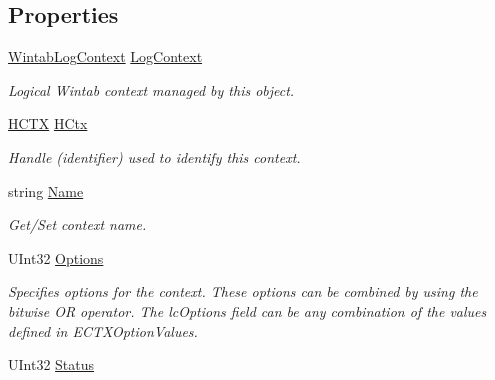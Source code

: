 \subsection*{Properties}
\begin{DoxyCompactItemize}
\item 
\mbox{\hyperlink{struct_wintab_d_n_1_1_wintab_log_context}{Wintab\+Log\+Context}} \mbox{\hyperlink{class_wintab_d_n_1_1_c_wintab_context_ad1aaf328b7c7aeb2b98e8c4e167047b6}{Log\+Context}}
\begin{DoxyCompactList}\small\item\em Logical Wintab context managed by this object. ~\newline
\end{DoxyCompactList}\item 
\mbox{\hyperlink{class_wintab_d_n_1_1_h_c_t_x}{H\+C\+TX}} \mbox{\hyperlink{class_wintab_d_n_1_1_c_wintab_context_ad4709db10fbf92aa19dcdf0c19c53415}{H\+Ctx}}
\begin{DoxyCompactList}\small\item\em Handle (identifier) used to identify this context. \end{DoxyCompactList}\item 
string \mbox{\hyperlink{class_wintab_d_n_1_1_c_wintab_context_a275c652af6e326a3b8750ae5ea047237}{Name}}
\begin{DoxyCompactList}\small\item\em Get/\+Set context name. \end{DoxyCompactList}\item 
U\+Int32 \mbox{\hyperlink{class_wintab_d_n_1_1_c_wintab_context_a3e5d1e938f9bd00d82474b670292b5a7}{Options}}
\begin{DoxyCompactList}\small\item\em Specifies options for the context. These options can be combined by using the bitwise OR operator. The lc\+Options field can be any combination of the values defined in E\+C\+T\+X\+Option\+Values. \end{DoxyCompactList}\item 
U\+Int32 \mbox{\hyperlink{class_wintab_d_n_1_1_c_wintab_context_a25169d39580b4d7a30d7feb05c1872d5}{Status}}

\end{DoxyCompactItemize}
